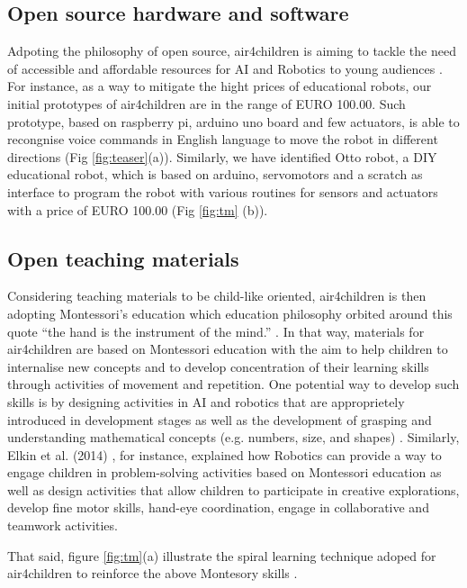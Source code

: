 \documentclass[sigconf]{acmart}
\begin{document}
\subsection{Open source hardware and software}
Adpoting the philosophy of open source, air4children is aiming to tackle the need of accessible and affordable resources for AI and Robotics to young audiences \cite{UNICEF2020}.
For instance, as a way to mitigate the hight prices of educational robots, our initial prototypes of air4children are in the range of EURO 100.00. 
Such prototype, based on raspberry pi, arduino uno board and few actuators, is able to recongnise voice commands in English language to move the robot in different directions (Fig \ref{fig:teaser}(a)).
Similarly, we have identified Otto robot, a DIY educational robot, which is based on arduino, servomotors and a scratch as interface to program the robot with various routines for sensors and actuators with a price of EURO 100.00 (Fig \ref{fig:tm} (b)). 

\subsection{Open teaching materials}
Considering teaching materials to be child-like oriented, air4children is then adopting Montessori's education which education philosophy orbited around this quote “the hand is the instrument of the mind.” \cite{montessori2013absorbent}.
In that way, materials for air4children are based on Montessori education with the aim to help children to internalise new concepts and to develop concentration of their learning skills through activities of movement and repetition.
One potential way to develop such skills is by designing activities in AI and robotics that are approprietely introduced in development stages \cite{bers2008, bers-horn2010, kazakoff-bers2012} as well as the development of grasping and understanding mathematical concepts (e.g. numbers, size, and shapes) \cite{bers2012, resnick1998}.
Similarly, Elkin et al. (2014) \cite{elkin2014}, for instance, explained how Robotics can provide a way to engage children in problem-solving activities based on Montessori education as well as design activities that allow children to participate in creative explorations, develop fine motor skills, hand-eye coordination, engage in collaborative and teamwork activities.

That said, figure \ref{fig:tm}(a) illustrate the spiral learning technique adoped for air4children to reinforce the above Montesory skills \cite{tarik2017}.
\end{document}

